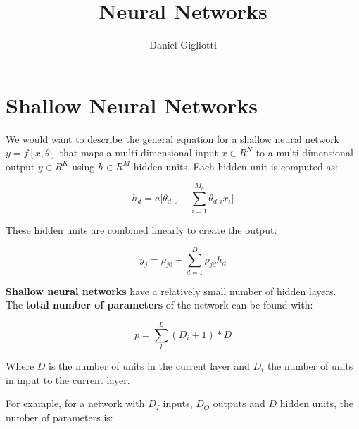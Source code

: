 \documentclass{article}
\title{Neural Networks}
\author{Daniel Gigliotti}
\date{}
\begin{document}
\maketitle

\section{Shallow Neural Networks}

\vspace{0.5cm}
\begin{center}
\end{center}
\vspace{0.5cm}

We would want to describe the general equation for a shallow neural network $y = f[x, \theta]$ that maps a multi-dimensional input $x \in R^N$ to a multi-dimensional output $y \in R^K$ using $h \in R^M$ hidden units. Each hidden unit is computed as:

\begin{equation*}
    h_d = a\big[\theta_{d,0} + \sum_{i=1}^{M_d} \theta_{d,i} x_i \big]
\end{equation*}

These hidden units are combined linearly to create the output:

\begin{equation*}
    y_j = \rho_{j0} + \sum_{d=1}^{D} \rho_{jd} h_d 
\end{equation*}

\textbf{Shallow neural networks} have a relatively small number of hidden layers. \\

The \textbf{total number of parameters} of the network can be found with:

\begin{equation*}
    p = \sum_{l}^{L} (D_i + 1) * D 
\end{equation*}

Where $D$ is the number of units in the current layer and $D_i$ the number of units in input to the current layer. 

For example, for a network with $D_I$ inputs, $D_O$ outputs and $D$ hidden units, the number of parameters is:
\end{document}
